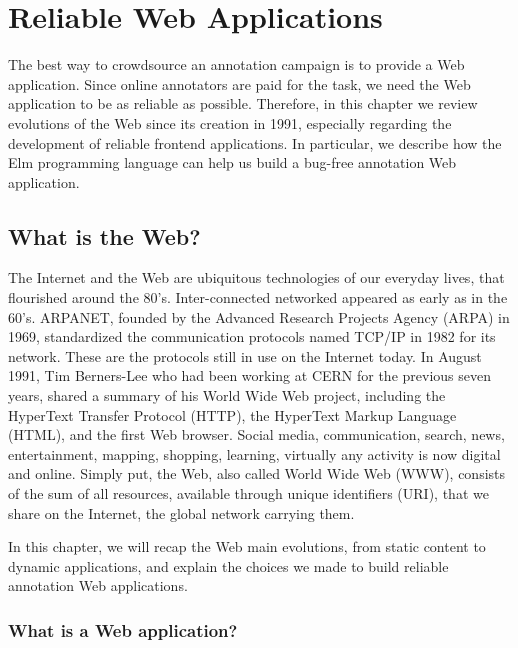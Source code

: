\chapter{Reliable Web Applications}%
\label{cha:reliable_web_applications}

\minitoc%

\clearpage

The best way to crowdsource an annotation campaign is to provide a Web application.
Since online annotators are paid for the task,
we need the Web application to be as reliable as possible.
Therefore, in this chapter we review evolutions of the Web
since its creation in 1991, especially regarding the development
of reliable frontend applications.
In particular, we describe how the Elm programming language can help us
build a bug-free annotation Web application.

\section{What is the Web?}%
\label{sec:web}

The Internet and the Web are ubiquitous technologies of our everyday lives,
that flourished around the 80's.
Inter-connected networked appeared as early as in the 60's.
ARPANET, founded by the Advanced Research Projects Agency (ARPA) in 1969,
standardized the communication protocols named TCP/IP in 1982 for its network.
These are the protocols still in use on the Internet today.
In August 1991, Tim Berners-Lee who had been working at CERN for the previous seven years,
shared a summary of his World Wide Web project,
including the HyperText Transfer Protocol (HTTP),
the HyperText Markup Language (HTML), and the first Web browser.
Social media, communication, search, news, entertainment, mapping,
shopping, learning, virtually any activity is now digital and online.
Simply put, the Web, also called World Wide Web (WWW), consists of the sum of all resources,
available through unique identifiers (URI), that we share on the Internet,
the global network carrying them.

In this chapter, we will recap the Web main evolutions,
from static content to dynamic applications,
and explain the choices we made to build reliable annotation Web applications.

\subsection{What is a Web application?}%
\label{sub:web_application}

